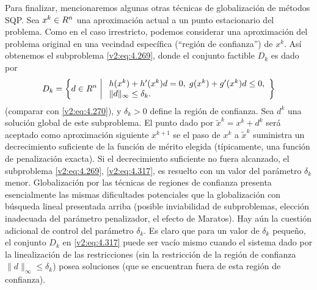 Para finalizar, mencionaremos algunas otras técnicas de globalización de métodos SQP. Sea $x^k \in R^n$ una aproximación actual a un punto estacionario del problema. Como en el caso irrestricto, podemos considerar una aproximación del problema original en una vecindad específica (``región de confianza'') de $x^k$. Así obtenemos el subproblema \eqref{v2:eq:4.269}, donde el conjunto factible $D_k$ es dado por
\begin{equation}
    D_k = \left\{ d \in R^n \;\middle|\; \begin{array}{l} h(x^k) + h'(x^k)d = 0, \; g(x^k) + g'(x^k)d \le 0, \\ \|d\|_\infty \le \delta_k. \end{array} \right\}
    \label{v2:eq:4.317}
\end{equation}
(comparar con \eqref{v2:eq:4.270}), y $\delta_k > 0$ define la región de confianza. Sea $d^k$ una solución global de este subproblema. El punto dado por $\tilde{x}^k = x^k + d^k$ será aceptado como aproximación siguiente $x^{k+1}$ se el paso de $x^k$ a $\tilde{x}^k$ suministra un decrecimiento suficiente de la función de mérito elegida (típicamente, una función de penalización exacta). Si el decrecimiento suficiente no fuera alcanzado, el subproblema \eqref{v2:eq:4.269}, \eqref{v2:eq:4.317}, es resuelto con un valor del parámetro $\delta_k$ menor. Globalización por las técnicas de regiones de confianza presenta esencialmente las mismas dificultades potenciales que la globalización con búsqueda lineal presentada arriba (posible inviabilidad de subproblemas, elección inadecuada del parámetro penalizador, el efecto de Maratos). Hay aún la cuestión adicional de control del parámetro $\delta_k$. Es claro que para un valor de $\delta_k$ pequeño, el conjunto $D_k$ en \eqref{v2:eq:4.317} puede ser vacío mismo cuando el sistema dado por la linealización de las restricciones (sin la restricción de la región de confianza $\|d\|_\infty \le \delta_k$) posea soluciones (que se encuentran fuera de esta región de confianza).

